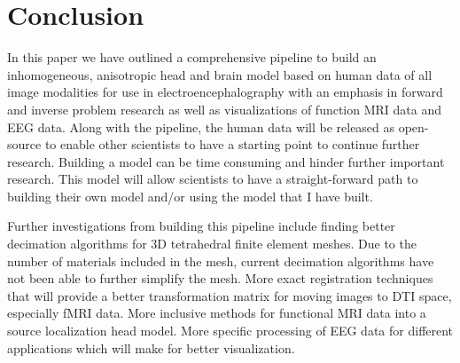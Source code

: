 %
%

\section{Conclusion}
\label{sec:Conclusion}

In this paper we have outlined a comprehensive pipeline to build an inhomogeneous, anisotropic head and brain model based on human data of all image modalities for use in electroencephalography with an emphasis in forward and inverse problem research as well as visualizations of function MRI data and EEG data. Along with the pipeline, the human data will be released as open-source to enable other scientists to have a starting point to continue further research. Building a model can be time consuming and hinder further important research. This model will allow scientists to have a straight-forward path to building their own model and/or using the model that I have built.

Further investigations from building this pipeline include finding better decimation algorithms for 3D tetrahedral finite element meshes. Due to the number of materials included in the mesh, current decimation algorithms have not been able to further simplify the mesh. More exact registration techniques that will provide a better transformation matrix for moving images to DTI space, especially fMRI data. More inclusive methods for functional MRI data into a source localization head model. More specific processing of EEG data for different applications which will make for better visualization. 